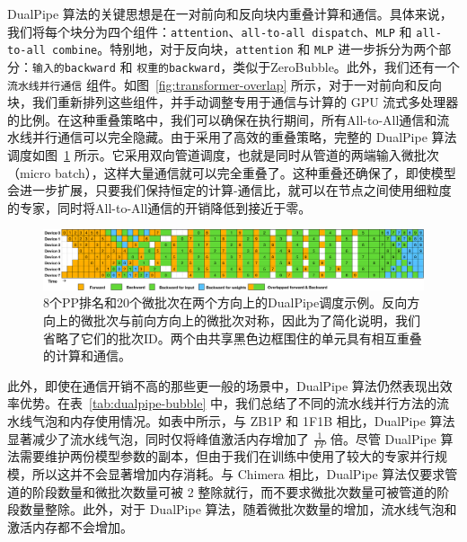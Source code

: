 \documentclass[lang=cn,a4paper,newtx]{elegantpaper}
\begin{document}
DualPipe 算法的关键思想是在一对前向和反向块内重叠计算和通信。具体来说，我们将每个块分为四个组件：\texttt{attention}、\texttt{all-to-all dispatch}、\texttt{MLP} 和 \texttt{all-to-all combine}。特别地，对于反向块，\texttt{attention} 和 \texttt{MLP} 进一步拆分为两个部分：\texttt{输入的backward} 和 \texttt{权重的backward}，类似于ZeroBubble。此外，我们还有一个 \texttt{流水线并行通信} 组件。如图~\ref{fig:transformer-overlap} 所示，对于一对前向和反向块，我们重新排列这些组件，并手动调整专用于通信与计算的 GPU 流式多处理器的比例。在这种重叠策略中，我们可以确保在执行期间，所有All-to-All通信和流水线并行通信可以完全隐藏。由于采用了高效的重叠策略，完整的 DualPipe 算法调度如图~\ref{fig:dualpipe-schedules} 所示。它采用双向管道调度，也就是同时从管道的两端输入微批次（micro batch），这样大量通信就可以完全重叠了。这种重叠还确保了，即使模型会进一步扩展，只要我们保持恒定的计算-通信比，就可以在节点之间使用细粒度的专家，同时将All-to-All通信的开销降低到接近于零。

\begin{figure}[t]
    \centering
    \includegraphics[width=0.99\linewidth]{figures/dualpipe.pdf}
    \caption{
        8个PP排名和20个微批次在两个方向上的DualPipe调度示例。反向方向上的微批次与前向方向上的微批次对称，因此为了简化说明，我们省略了它们的批次ID。两个由共享黑色边框围住的单元具有相互重叠的计算和通信。
    }
    \label{fig:dualpipe-schedules}
\end{figure}

此外，即使在通信开销不高的那些更一般的场景中，DualPipe 算法仍然表现出效率优势。在表~\ref{tab:dualpipe-bubble} 中，我们总结了不同的流水线并行方法的流水线气泡和内存使用情况。如表中所示，与 ZB1P 和 1F1B 相比，DualPipe 算法显著减少了流水线气泡，同时仅将峰值激活内存增加了 $\frac{1}{PP}$ 倍。尽管 DualPipe 算法需要维护两份模型参数的副本，但由于我们在训练中使用了较大的专家并行规模，所以这并不会显著增加内存消耗。与 Chimera 相比，DualPipe 算法仅要求管道的阶段数量和微批次数量可被 2 整除就行，而不要求微批次数量可被管道的阶段数量整除。此外，对于 DualPipe 算法，随着微批次数量的增加，流水线气泡和激活内存都不会增加。
\end{document}
